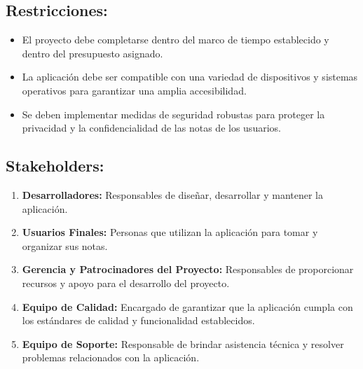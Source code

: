 \subsection{Restricciones:}
\begin{itemize}
    \item El proyecto debe completarse dentro del marco de tiempo establecido y dentro del presupuesto asignado.
    \item La aplicación debe ser compatible con una variedad de dispositivos y sistemas operativos para garantizar una amplia accesibilidad.
    \item Se deben implementar medidas de seguridad robustas para proteger la privacidad y la confidencialidad de las notas de los usuarios.
\end{itemize}

\subsection{Stakeholders:}
\begin{enumerate}
    \item \textbf{Desarrolladores:} Responsables de diseñar, desarrollar y mantener la aplicación.
    \item \textbf{Usuarios Finales:} Personas que utilizan la aplicación para tomar y organizar sus notas.
    \item \textbf{Gerencia y Patrocinadores del Proyecto:} Responsables de proporcionar recursos y apoyo para el desarrollo del proyecto.
    \item \textbf{Equipo de Calidad:} Encargado de garantizar que la aplicación cumpla con los estándares de calidad y funcionalidad establecidos.
    \item \textbf{Equipo de Soporte:} Responsable de brindar asistencia técnica y resolver problemas relacionados con la aplicación.
\end{enumerate}